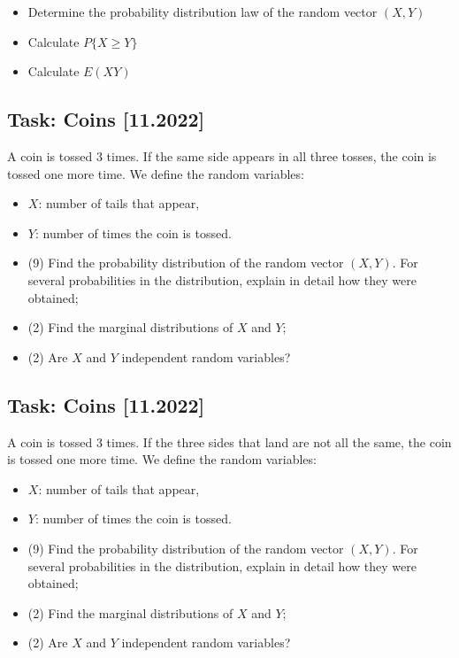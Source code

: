 \documentclass[a4paper, 12pt]{article}
\begin{document}
\begin{itemize}
    \item [a)] Determine the probability distribution law of the random vector $(X, Y)$
    \item [b)] Calculate $P\{X \geq Y\}$
    \item [c)] Calculate $E(XY)$
\end{itemize}



\subsection*{Task: Coins [11.2022]}

A coin is tossed 3 times. If the same side appears in all three tosses, the coin is tossed one more time. We define the random variables:
\begin{itemize}
    \item [] $X$: number of tails that appear,
    \item [] $Y$: number of times the coin is tossed.
\end{itemize}

\begin{itemize}
    \item [a)] (9) Find the probability distribution of the random vector $(X, Y)$. For several probabilities in the distribution, explain in detail how they were obtained;
    \item [b)] (2) Find the marginal distributions of $X$ and $Y$;
    \item [c)] (2) Are $X$ and $Y$ independent random variables?
\end{itemize}



\subsection*{Task: Coins [11.2022]}

A coin is tossed 3 times. If the three sides that land are not all the same, the coin is tossed one more time. We define the random variables:
\begin{itemize}
    \item [] $X$: number of tails that appear,
    \item [] $Y$: number of times the coin is tossed.
\end{itemize}

\begin{itemize}
    \item [a)] (9) Find the probability distribution of the random vector $(X, Y)$. For several probabilities in the distribution, explain in detail how they were obtained;
    \item [b)] (2) Find the marginal distributions of $X$ and $Y$;
    \item [c)] (2) Are $X$ and $Y$ independent random variables?
\end{itemize}
\end{document}
